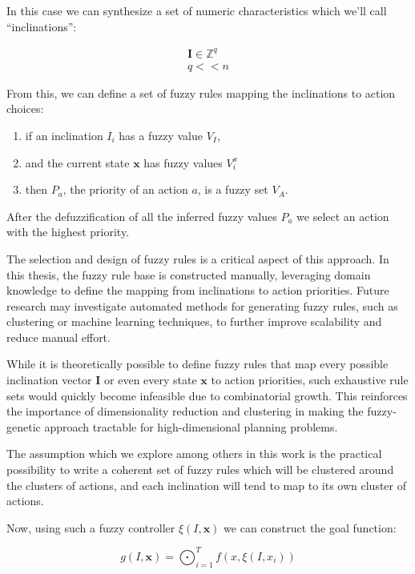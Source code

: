 \documentclass[11pt, a4paper]{article}
\begin{document}
	In this case we can synthesize a set of numeric characteristics which we'll call ``inclinations'':
	
	\begin{eqnarray}
		\mathbf{I} \in \mathbb{Z}^q\\
		q << n \label{q<<n}
	\end{eqnarray}

	From this, we can define a set of fuzzy rules\cite{ray2014softcomputing} mapping the inclinations to action choices:

	\begin{enumerate}
		\item if an inclination $I_i$ has a fuzzy value $V_I$,
		\item and the current state $\mathbf{x}$ has fuzzy values $V^x_i$
		\item then $P_a$, the priority of an action $a$, is a fuzzy set $V_A$.
	\end{enumerate}
	
	After the defuzzification of all the inferred fuzzy values $P_a$ we select an action with the highest priority.
	
	The selection and design of fuzzy rules is a critical aspect of this approach.
	In this thesis, the fuzzy rule base is constructed manually, leveraging domain knowledge to define the mapping from inclinations to action priorities.
	Future research may investigate automated methods for generating fuzzy rules, such as clustering or machine learning techniques, to further improve scalability and reduce manual effort.

	While it is theoretically possible to define fuzzy rules that map every possible inclination vector $\mathbf{I}$ or even every state $\mathbf{x}$ to action priorities, such exhaustive rule sets would quickly become infeasible due to combinatorial growth.
	This reinforces the importance of dimensionality reduction and clustering in making the fuzzy-genetic approach tractable for high-dimensional planning problems.

	The assumption which we explore among others in this work is the practical possibility to write a coherent set of fuzzy rules which will be clustered around the clusters of actions, and each inclination will tend to map to its own cluster of actions.
	
	Now, using such a fuzzy controller $\xi(I, \mathbf{x})$ we can construct the goal function:
	
	\begin{equation}\label{definitions:goal-function}
		g(I, \mathbf{x}) = \bigodot_{i=1}^{T} f(x, \xi(I, x_i))
	\end{equation}
	
\end{document}
